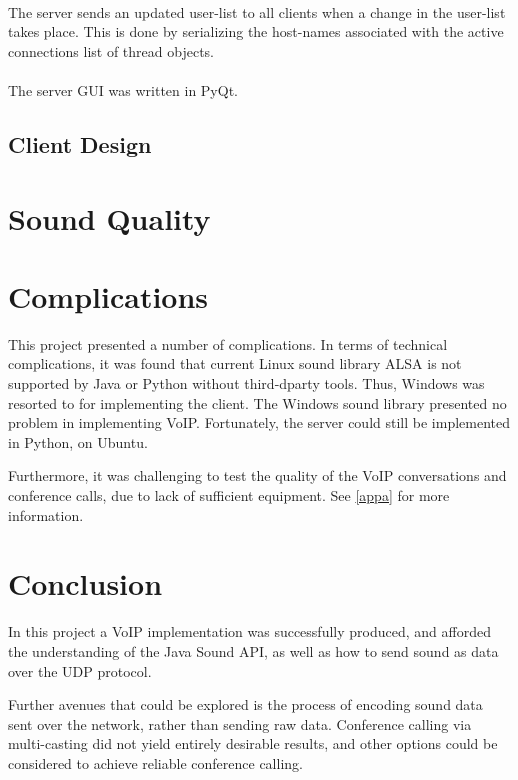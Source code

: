 \documentclass[10pt,a4paper]{article}
\begin{document}
\paragraph{}
The server sends an updated user-list to all clients when a change in the user-list takes place. This is done by serializing the
host-names associated with the  active connections list of thread objects.
\paragraph{}
The server GUI was written in PyQt.

\subsection{Client Design}


\section{Sound Quality} %

\section{Complications} %
\label{comp}

This project presented a number of complications. In terms of technical
complications, it was found that current Linux sound library ALSA is not 
supported by Java or Python without third-dparty tools. Thus, Windows was
resorted to for implementing the client. The Windows sound library presented no
problem in implementing VoIP. Fortunately, the server could still be implemented
in Python, on Ubuntu. 

Furthermore, it was challenging to test the quality of the VoIP conversations
and conference calls, due to lack of sufficient equipment. See \ref{appa} for 
more information.

\section{Conclusion}
In this project a VoIP implementation was successfully produced, and afforded
the understanding of the Java Sound API, as well as how to send sound as data
over the UDP protocol. 

Further avenues that could be explored is the process of encoding sound
data sent over the network, rather than sending raw data. Conference calling
via multi-casting did not yield entirely desirable results, and other options
could be considered to achieve reliable conference calling.
\end{document}
